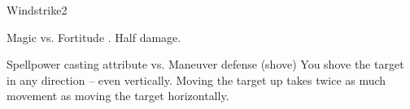 \begin{spellsection}{Windstrike}{2}
    \begin{spellheader}
    \end{spellheader}
    \begin{spellcontent}
        \begin{spelltargetinginfo}
        \end{spelltargetinginfo}
        \begin{spelleffects}
            \begin{spellattack}{Magic vs. Fortitude}
                \spellsuccess {}.
                \spellfailure Half damage.
            \end{spellattack}
            \begin{spellattack}{Spellpower \add casting attribute vs. Maneuver defense (shove)}
                \spellsuccess You shove the target in any direction -- even vertically. Moving the target up takes twice as much movement as moving the target horizontally.
            \end{spellattack}
        \end{spelleffects}
    \end{spellcontent}
    \begin{spellfooter}
        \miscastrandom
    \end{spellfooter}
\end{spellsection}

